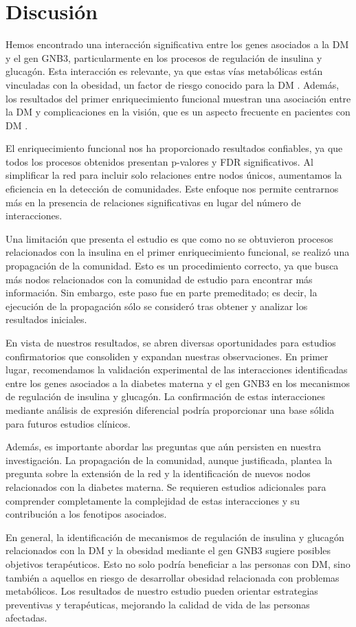\section{Discusión}

Hemos encontrado una interacción significativa entre los genes asociados a la DM y el gen GNB3, particularmente en los procesos de regulación de insulina y glucagón. Esta interacción es relevante, ya que estas vías metabólicas están vinculadas con la obesidad, un factor de riesgo conocido para la DM \cite{Shah2011}. Además, los resultados del primer enriquecimiento funcional muestran una asociación entre la DM y complicaciones en la visión, que es un aspecto frecuente en pacientes con DM \cite{Bailes2002}.


El enriquecimiento funcional nos ha proporcionado resultados confiables, ya que todos los procesos obtenidos presentan p-valores y FDR significativos. Al simplificar la red para incluir solo relaciones entre nodos únicos, aumentamos la eficiencia en la detección de comunidades. Este enfoque nos permite centrarnos más en la presencia de relaciones significativas en lugar del número de interacciones.

Una limitación que presenta el estudio es que como no se obtuvieron procesos relacionados con la insulina en el primer enriquecimiento funcional, se realizó una propagación de la comunidad. Esto es un procedimiento correcto, ya que busca más nodos relacionados con la comunidad de estudio para encontrar más información. Sin embargo, este paso fue en parte premeditado; es decir, la ejecución de la propagación sólo se consideró tras obtener y analizar los resultados iniciales.

En vista de nuestros resultados, se abren diversas oportunidades para estudios confirmatorios que consoliden y expandan nuestras observaciones. En primer lugar, recomendamos la validación experimental de las interacciones identificadas entre los genes asociados a la diabetes materna y el gen GNB3 en los mecanismos de regulación de insulina y glucagón. La confirmación de estas interacciones mediante análisis de expresión diferencial \cite{Haynes2013} podría proporcionar una base sólida para futuros estudios clínicos.

Además, es importante abordar las preguntas que aún persisten en nuestra investigación. La propagación de la comunidad, aunque justificada, plantea la pregunta sobre la extensión de la red y la identificación de nuevos nodos relacionados con la diabetes materna. Se requieren estudios adicionales para comprender completamente la complejidad de estas interacciones y su contribución a los fenotipos asociados.

En general, la identificación de mecanismos de regulación de insulina y glucagón relacionados con la DM y la obesidad  \cite{Shah2011} mediante el gen GNB3 sugiere posibles objetivos terapéuticos. Esto no solo podría beneficiar a las personas con DM, sino también a aquellos en riesgo de desarrollar obesidad relacionada con problemas metabólicos. Los resultados de nuestro estudio pueden orientar estrategias preventivas y terapéuticas, mejorando la calidad de vida de las personas afectadas.

